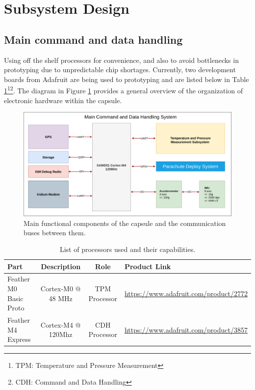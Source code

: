 \documentclass{article}
\begin{document}
\section{Subsystem Design}
\label{sec:ss-design}

\subsection{Main command and data handling}

Using off the shelf processors for convenience, and also to avoid bottlenecks in prototyping due to unpredictable chip shortages. Currently, two development boards from Adafruit are being used to prototyping and are listed below in Table \ref{tab:processors}\footnote{TPM: Temperature and Pressure Measurement}\footnote{CDH: Command and Data Handling}. The diagram in Figure \ref{fig:main-overview} provides a general overview of the organization of electronic hardware within the capsule. 

\begin{figure}[h!]
	\centering
	\includegraphics[width=\textwidth]{images/amtps-main-system.png}
	\caption{Main functional components of the capsule and the communication buses between them.}
	\label{fig:main-overview}
\end{figure}


\begin{table}[h!]	
	\caption{List of processors used and their capabilities.}
	\begin{tabular}{l | c c m{5cm}}
		Part & Description & Role & Product Link \\
		\hline
		Feather M0 Basic Proto & Cortex-M0 @ 48 MHz & TPM Processor & \url{https://www.adafruit.com/product/2772}\\
		Feather M4 Express & Cortex-M4 @ 120Mhz & CDH Processor & \url{https://www.adafruit.com/product/3857} 
	\end{tabular}
	\label{tab:processors}
\end{table}
\end{document}
